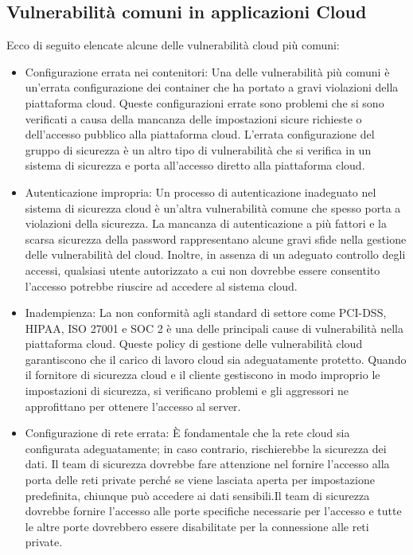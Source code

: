 \subsection{Vulnerabilità comuni in applicazioni Cloud}
Ecco di seguito elencate alcune delle vulnerabilità cloud più comuni:
\begin{itemize}
    \item Configurazione errata nei contenitori: Una delle vulnerabilità più comuni è un’errata configurazione dei container che ha portato a gravi violazioni della piattaforma cloud.
    Queste configurazioni errate sono problemi che si sono verificati a causa della mancanza delle impostazioni sicure richieste o dell'accesso pubblico alla piattaforma cloud. L'errata configurazione del gruppo di sicurezza è un altro tipo di vulnerabilità che si verifica in un sistema di sicurezza e porta all'accesso diretto alla piattaforma cloud.
    \item Autenticazione impropria: Un processo di autenticazione inadeguato nel sistema di sicurezza cloud è un’altra vulnerabilità comune che spesso porta a violazioni della sicurezza. La mancanza di autenticazione a più fattori e la scarsa sicurezza della password rappresentano alcune gravi sfide nella gestione delle vulnerabilità del cloud.
    Inoltre, in assenza di un adeguato controllo degli accessi, qualsiasi utente autorizzato a cui non dovrebbe essere consentito l'accesso potrebbe riuscire ad accedere al sistema cloud.
    \item Inadempienza: La non conformità agli standard di settore come PCI-DSS, HIPAA, ISO 27001 e SOC 2 è una delle principali cause di vulnerabilità nella piattaforma cloud. Queste policy di gestione delle vulnerabilità cloud garantiscono che il carico di lavoro cloud sia adeguatamente protetto.
    Quando il fornitore di sicurezza cloud e il cliente gestiscono in modo improprio le impostazioni di sicurezza, si verificano problemi e gli aggressori ne approfittano per ottenere l’accesso al server. 
    \item Configurazione di rete errata: È fondamentale che la rete cloud sia configurata adeguatamente; in caso contrario, rischierebbe la sicurezza dei dati. Il team di sicurezza dovrebbe fare attenzione nel fornire l'accesso alla porta delle reti private perché se viene lasciata aperta per impostazione predefinita, chiunque può accedere ai dati sensibili.Il team di sicurezza dovrebbe fornire l'accesso alle porte specifiche necessarie per l'accesso e tutte le altre porte dovrebbero essere disabilitate per la connessione alle reti private.

\end{itemize}
